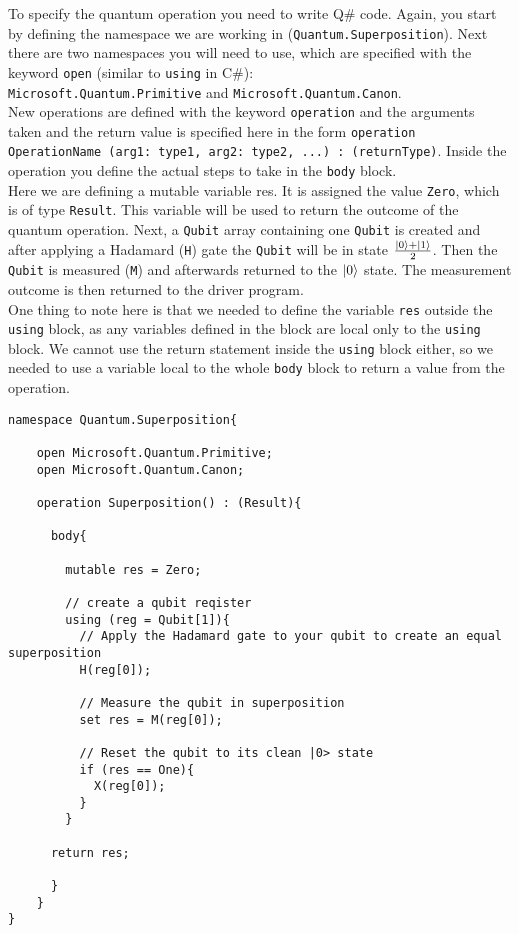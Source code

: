 To specify the quantum operation you need to write Q\# code. Again, you start by defining the namespace we are working in (\texttt{Quantum.Superposition}). Next there are two namespaces you will need to use, which are specified with the keyword \texttt{open} (similar to \texttt{using} in C\#): \\ \texttt{Microsoft.Quantum.Primitive} and \texttt{Microsoft.Quantum.Canon}.\\
New operations are defined with the keyword \texttt{operation} and the arguments taken and the return value is specified here in the form \texttt{operation OperationName (arg1: type1, arg2: type2, ...) : (returnType)}.
Inside the operation you define the actual steps to take in the \texttt{body} block. \\
Here we are defining a mutable variable res. It is assigned the value \texttt{Zero}, which is of type \texttt{Result}. This variable will be used to return the outcome of the quantum operation. Next, a \texttt{Qubit} array containing one \texttt{Qubit} is created and after applying a Hadamard (\texttt{H}) gate the \texttt{Qubit} will be in state $\frac{\left\vert{0}\right\rangle+\left\vert{1}\right\rangle}{2}$. Then the \texttt{Qubit} is measured (\texttt{M}) and afterwards returned to the $\left\vert{0}\right\rangle$ state. The measurement outcome is then returned to the driver program. \\
One thing to note here is that we needed to define the variable \texttt{res} outside the \texttt{using} block, as any variables defined in the block are local only to the \texttt{using} block. We cannot use the return statement inside the \texttt{using} block either, so we needed to use a variable local to the whole \texttt{body} block to return a value from the operation.\\

\begin{lstlisting}[language=Qsharp,caption={A simple program in Q\# creating and measuring an equal superposition.},label={lst:Q\#Simple}]
namespace Quantum.Superposition{

    open Microsoft.Quantum.Primitive;
    open Microsoft.Quantum.Canon;

    operation Superposition() : (Result){

      body{

        mutable res = Zero;

	    // create a qubit reqister
	    using (reg = Qubit[1]){
	      // Apply the Hadamard gate to your qubit to create an equal superposition
          H(reg[0]);

	      // Measure the qubit in superposition
	      set res = M(reg[0]);

	      // Reset the qubit to its clean |0> state
	      if (res == One){
	        X(reg[0]);
	      }
	    }

      return res;
            
      }
    }
}
\end{lstlisting}

